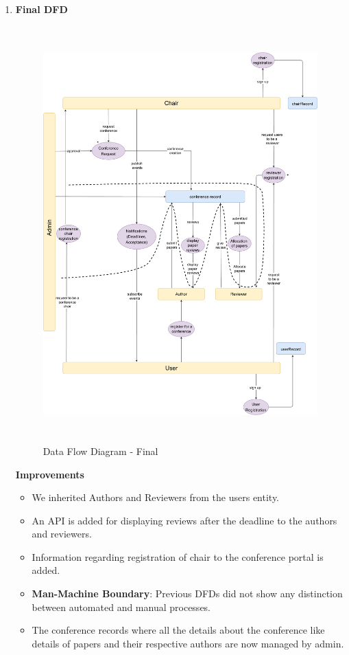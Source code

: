 \documentclass[english,a4paper,12pt]{report}
\begin{document}
\begin{enumerate}
\begin{itemize}
\end{itemize}
\item \textbf{Final DFD} \\
    \begin{figure}[h!]
\centering
 \includegraphics[keepaspectratio,height=16cm]{SRA-Images/DFD-final.pdf}
 \caption{Data Flow Diagram - Final}
\end{figure}
\textbf{Improvements}
\begin{itemize}
    \item We inherited Authors and Reviewers from the users entity.
    \item An API is added for displaying reviews after the deadline to the authors and reviewers.
    \item Information regarding registration of chair to the conference portal is added.
    \item \textbf{Man-Machine Boundary}: Previous DFDs did not show any distinction between
automated and manual processes.
\item The conference records where all the details about the conference like details of papers and their respective authors are now managed by admin.

\end{itemize}
\end{enumerate}

    
\end{document}
